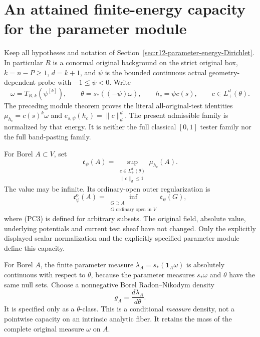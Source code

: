\section{An attained finite-energy capacity for the parameter module}
\label{sec:r12-parameter-energy-capacity}

Keep all hypotheses and notation of
Section~\ref{sec:r12-parameter-energy-Dirichlet}. In particular
$R$ is a conormal original background on the strict original box,
$k=n-P\ge1$, $d=k+1$, and $\psi$ is the bounded continuous
actual geometry-dependent probe with $-1\le\psi<0$.
Write
\[
        \omega=T_{R,k}(\psi^{[k]}),\qquad
        \theta=s_*((-\psi)\omega),\qquad
        h_c=\psi c(s),\qquad c\in L^d_+(\theta).
                                                                    \tag{PC1}
\]
The preceding module theorem proves the literal all-original-test
identities
$\mu_{h_c}=c(s)^k\omega$ and
$e_{s,\psi}(h_c)=\|c\|_d^d$. The present admissible family is
normalized by that energy. It is neither the full classical
$[0,1]$ tester family nor the full band-pasting family.

\begin{definition}
\label{def:r12-parameter-energy-capacity}
For Borel $A\subset V$, set
\[
       \mathfrak c_\psi(A)
          =\sup_{\substack{c\in L^d_+(\theta)\\\|c\|_d\le1}}
                                \mu_{h_c}(A).
                                                                    \tag{PC2}
\]
The value may be infinite. Its ordinary-open outer regularization is
\[
       \mathfrak c_\psi^{\mathrm o}(A)
          =\inf_{\substack{G\supset A\\G\text{ ordinary open in }V}}
                                      \mathfrak c_\psi(G),
                                                                    \tag{PC3}
\]
where (PC3) is defined for arbitrary subsets. The original field,
absolute value, underlying potentials and current test sheaf have
not changed. Only the explicitly displayed scalar normalization
and the explicitly specified parameter module define this capacity.
\end{definition}

For Borel $A$, the finite parameter measure
$\lambda_A=s_*(\mathbf1_A\omega)$ is absolutely continuous with
respect to $\theta$, because the parameter measures
$s_*\omega$ and $\theta$ have the same null sets. Choose a
nonnegative Borel Radon--Nikodym density
\[
                            g_A=\frac{d\lambda_A}{d\theta}.
                                                                    \tag{PC4}
\]
It is specified only as a $\theta$-class. This is a conditional
\emph{measure} density, not a pointwise capacity on an intrinsic
analytic fiber. It retains the mass of the complete original
measure $\omega$ on $A$.

